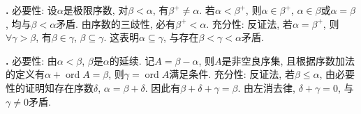\par \textbf{\thesolpar .} 必要性: 设$\alpha$是极限序数, 对$\beta<\alpha$, 有$\beta^+\neq \alpha$. 若$\alpha<\beta^+$, 则$\alpha\in \beta^+$, $\alpha \in \beta$或$\alpha=\beta$, 均与$\beta<\alpha$矛盾. 由序数的三歧性, 必有$\beta^+<\alpha$. 充分性: 反证法, 若$\alpha=\beta^+$, 则$\forall \gamma>\beta$, 有$\beta \in \gamma$, $\beta \subseteq \gamma$. 这表明$\alpha \subseteq \gamma$, 与存在$\beta<\gamma<\alpha$矛盾. 

\par \textbf{\thesolpar .} 必要性: 由$\alpha<\beta$, $\beta$是$\alpha$的延续. 记$A=\beta-\alpha$, 则$A$是非空良序集, 且根据序数加法的定义有$\alpha+\operatorname{ord}A=\beta$, 则$\gamma=\operatorname{ord}A$满足条件. 充分性: 反证法, 若$\beta\le \alpha$, 由必要性的证明知存在序数$\delta$, $\alpha=\beta+\delta$. 因此有$\beta+\delta+\gamma=\beta$. 由左消去律, $\delta+\gamma=0$, 与$\gamma\neq 0$矛盾. 